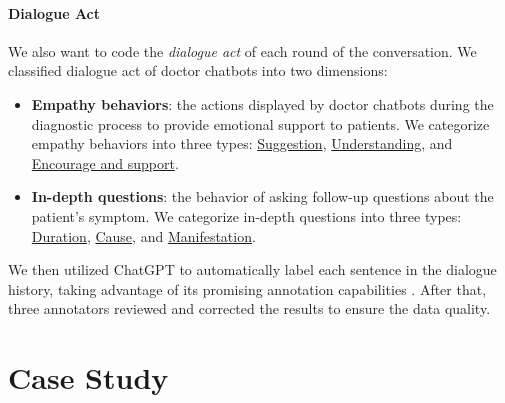 \paragraph{Dialogue Act}
We also want to code the \textit{dialogue act} of each round of the conversation. We classified dialogue act of doctor chatbots into two dimensions: 
\begin{itemize}
    \item \textbf{Empathy behaviors}: the actions displayed by doctor chatbots during the diagnostic process to provide emotional support to patients. We categorize empathy behaviors into three types: \uline{Suggestion}, \uline{Understanding}, and \uline{Encourage and support}.
    \item \textbf{In-depth questions}: the behavior of asking follow-up questions about the patient's symptom. We categorize in-depth questions into three types: \uline{Duration}, \uline{Cause}, and \uline{Manifestation}.
\end{itemize}

We then utilized ChatGPT to automatically label each sentence in the dialogue history, taking advantage of its promising annotation capabilities \cite{Gilardi2023ChatGPTOC}. After that, three annotators reviewed and corrected the results to ensure the data quality.

\section{Case Study}
\label{apd:examples}

